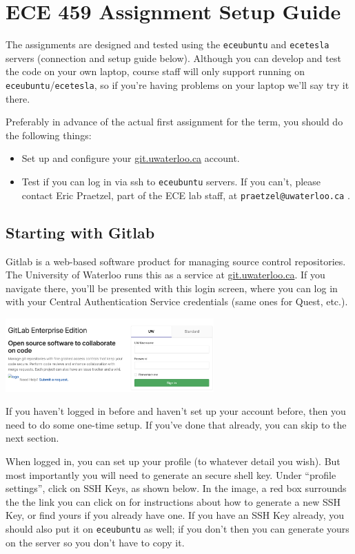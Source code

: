 \documentclass[letterpaper,10pt]{article}
\begin{document}
\section*{ECE 459 Assignment Setup Guide}

The assignments are designed and tested using the \texttt{eceubuntu} and \texttt{ecetesla} servers (connection and setup guide below). Although you can develop and test the code on your own laptop, course staff will only support running on \texttt{eceubuntu}/\texttt{ecetesla}, so if you're having problems on your laptop we'll say try it there. 

Preferably in advance of the actual first assignment for the term, you should do the following things:
\begin{itemize}
	\item Set up and configure your \url{git.uwaterloo.ca} account.
	\item Test if you can log in via ssh to \texttt{eceubuntu} servers. If you can't, please contact Eric Praetzel, part of the ECE lab staff,  at \texttt{praetzel@uwaterloo.ca} .
\end{itemize}

\subsection*{Starting with Gitlab}
Gitlab is a web-based software product for managing source control repositories. The University of Waterloo runs this as a service at \url{git.uwaterloo.ca}. If you navigate there, you'll be presented with this login screen, where you can log in with your Central Authentication Service credentials (same ones for Quest, etc.). 

\begin{center}
	\includegraphics[width=0.6\textwidth]{images/gitlab-login.png}
\end{center}

If you haven't logged in before and haven't set up your account before, then you need to do some one-time setup. If you've done that already, you can skip to the next section.

When logged in, you can set up your profile (to whatever detail you wish). But most importantly you will need to generate an secure shell key. Under ``profile settings'', click on SSH Keys, as shown below. In the image, a red box surrounds the the link you can click on for instructions about how to generate a new SSH Key, or find yours if you already have one. If you have an SSH Key already, you should also put it on \texttt{eceubuntu} as well; if you don't then you can generate yours on the server so you don't have to copy it.
\end{document}
